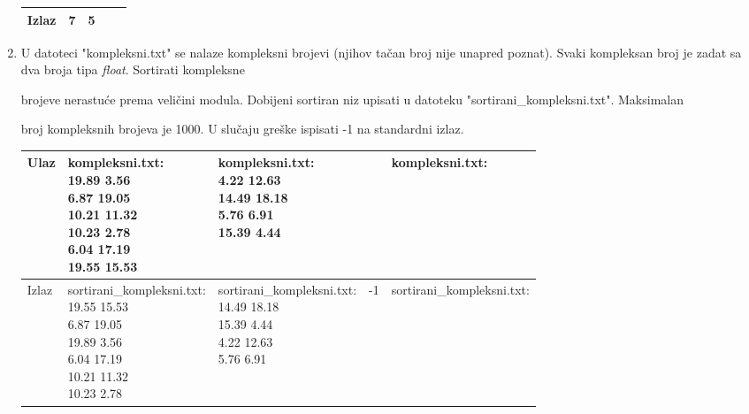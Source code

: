 \begin{enumerate}
\begin{tabular}{ |l|l|l|l|l| }
  Izlaz &7 & 5 &  &  \\ \hline

\end{tabular}

\normalsize



\item U datoteci "kompleksni.txt" se nalaze kompleksni brojevi (njihov ta\v can broj nije unapred poznat). Svaki kompleksan broj je zadat sa dva broja tipa \emph{float}. Sortirati kompleksne

   brojeve nerastu\' ce prema veli\v cini modula. Dobijeni sortiran niz upisati u datoteku "sortirani\_kompleksni.txt". Maksimalan

   broj kompleksnih brojeva je 1000. U slu\v caju gre\v ske ispisati -1 na standardni izlaz.



\small

\begin{tabular}{ |l|l|l|l|l| }

\hline

  Ulaz &



  \mlcell{kompleksni.txt:\\19.89 3.56 \\ 6.87 19.05 \\ 10.21 11.32 \\ 10.23 2.78 \\ 6.04 17.19 \\ 19.55 15.53} &

  \mlcell{kompleksni.txt:\\4.22 12.63\\14.49 18.18\\5.76 6.91\\15.39 4.44}&

  & kompleksni.txt: \\ \hline

  Izlaz &

  \mlcell{sortirani\_kompleksni.txt:\\19.55 15.53\\6.87 19.05\\19.89 3.56\\6.04 17.19\\10.21 11.32\\10.23 2.78} &

  \mlcell{sortirani\_kompleksni.txt:\\14.49 18.18\\15.39 4.44\\4.22 12.63\\5.76 6.91}&

  -1 & sortirani\_kompleksni.txt:\\ \hline

\end{tabular}

\normalsize

\end{enumerate}




